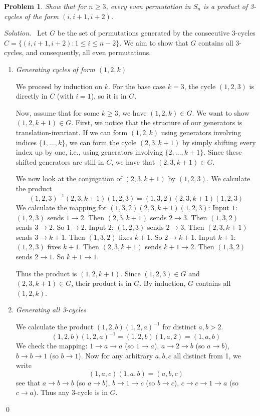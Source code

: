 \documentclass[12pt,a4paper]{article}
\newenvironment{solution}{%
  \par\noindent\textit{Solution.}\ }{\qed}
\theoremstyle{problemstyle}
\newtheorem{problem}{Problem}[section]
\begin{document}
\begin{problem}\label{prob:1.4}
    Show that for $n \ge 3$, every even permutation in $S_n$ is a product of 3-cycles of the form $(i, i+1, i+2)$.
\end{problem}
\begin{solution}
    Let $G$ be the set of permutations generated by the consecutive 3-cycles $C = \{ (i, i+1, i+2) : 1 \le i \le n-2 \}$. We aim to show that $G$ contains all 3-cycles, and consequently, all even permutations.
    
    \begin{enumerate}[\label=\Roman*.]
    \item \textit{Generating cycles of form $(1, 2, k)$}
    
    We proceed by induction on $k$.
    For the base case $k=3$, the cycle $(1, 2, 3)$ is directly in $C$ (with $i=1$), so it is in $G$.
    
    Now, assume that for some $k \ge 3$, we have $(1, 2, k) \in G$. We want to show $(1, 2, k+1) \in G$.
    First, we notice that the structure of our generators is translation-invariant. If we can form $(1, 2, k)$ using generators involving indices $\{1, \dots, k\}$, we can form the cycle $(2, 3, k+1)$ by simply shifting every index up by one, i.e., using generators involving $\{2, \dots, k+1\}$. Since these shifted generators are still in $C$, we have that $(2, 3, k+1) \in G$.
    
    We now look at the conjugation of $(2, 3, k+1)$ by $(1, 2, 3)$. We calculate the product
    $$ (1, 2, 3)^{-1} (2, 3, k+1) (1, 2, 3) = (1, 3, 2)(2, 3, k+1)(1, 2, 3) $$
    We calculate the mapping for $(1,3,2)(2,3,k+1)(1,2,3)$:
    Input $1$: $(1,2,3)$ sends $1 \to 2$. Then $(2,3,k+1)$ sends $2 \to 3$. Then $(1,3,2)$ sends $3 \to 2$. So $1 \to 2$.
    Input $2$: $(1,2,3)$ sends $2 \to 3$. Then $(2,3,k+1)$ sends $3 \to k+1$. Then $(1,3,2)$ fixes $k+1$. So $2 \to k+1$.
    Input $k+1$: $(1,2,3)$ fixes $k+1$. Then $(2,3,k+1)$ sends $k+1 \to 2$. Then $(1,3,2)$ sends $2 \to 1$. So $k+1 \to 1$.
    
    Thus the product is $(1, 2, k+1)$. Since $(1, 2, 3) \in G$ and $(2, 3, k+1) \in G$, their product is in $G$. By induction, $G$ contains all $(1, 2, k)$.
    
    \item \textit{Generating all 3-cycles}
    
    We calculate the product $(1, 2, b)(1, 2, a)^{-1}$ for distinct $a, b > 2$.
    $$(1, 2, b)(1, 2, a)^{-1} = (1, 2, b)(1, a, 2) = (1, a, b)$$
    We check the mapping: $1 \to a \to a$ (so $1 \to a$), $a \to 2 \to b$ (so $a \to b$), $b \to b \to 1$ (so $b \to 1$).
    Now for any arbitrary $a, b, c$ all distinct from 1, we write
    $$(1, a, c)(1, a, b) = (a, b, c)$$
    see that $a \to b \to b$ (so $a \to b$), $b \to 1 \to c$ (so $b \to c$), $c \to c \to 1 \to a$ (so $c \to a$).
    Thus any 3-cycle is in $G$.
    

\end{enumerate}
\end{solution}
\end{document}
